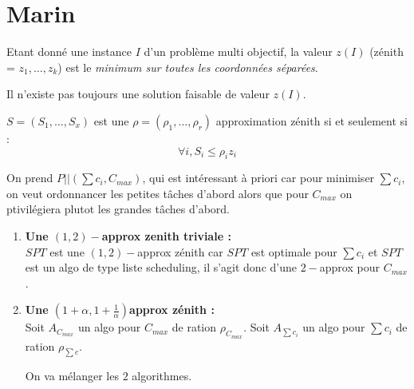 \documentclass[a4paper,11pt]{article}
\begin{document}
\chapter{Marin}

\begin{df}
    Etant donné une instance $I$ d'un problème multi objectif, la valeur $z(I)$ (zénith = $z_1,
    \dots, z_k$) est le \emph{minimum sur toutes les coordonnées séparées}.
\end{df}

\begin{rq}
    Il n'existe pas toujours une solution faisable de valeur $z(I)$.
\end{rq}

\begin{df}
    $S = (S_1, \dots, S_x)$ est une $\rho = (\rho_1, \dots, \rho_r)$ approximation zénith si et
    seulement si : \begin{displaymath}
        \forall i, S_i \leq \rho_i z_i
    \end{displaymath}
\end{df}

\begin{ex}
    On prend $P||(\sum c_i, C_{max})$, qui est intéressant à priori car pour minimiser $\sum c_i$,
    on veut ordonnancer les petites tâches d'abord alors que pour $C_{max}$ on ptivilégiera plutot
    les grandes tâches d'abord.

    \begin{enumerate}
        \item \textbf{Une $(1,2)-$approx zenith triviale :}\\

            $SPT$ est une $(1, 2)-$approx zénith car $SPT$ est optimale pour $\sum c_i$ et $SPT$ est
            un algo de type liste scheduling, il s'agit donc d'une $2-$approx pour $C_{max}$.
        \item \textbf{Une $(1 + \alpha, 1 + \frac{1}{\alpha})$approx zénith :}\\

            Soit $A_{C_{max}}$ un algo pour $C_{max}$ de ration $\rho_{C_{max}}$.
            Soit $A_{\sum c_i}$ un algo pour $\sum c_i$ de ration $\rho_{\sum c}$.

            On va mélanger les $2$ algorithmes.

            

    \end{enumerate}
\end{ex}
\end{document}

